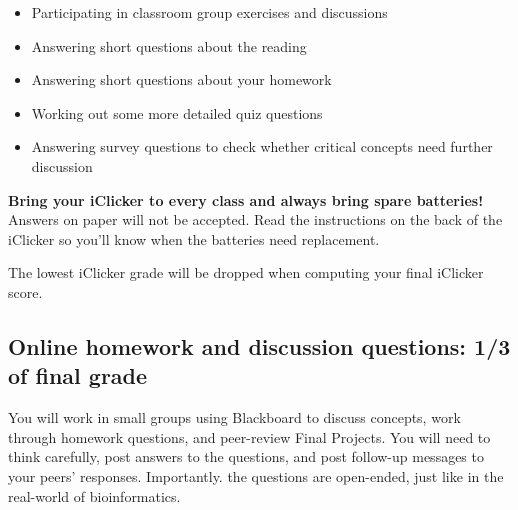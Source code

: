 \documentclass[12pt]{article}
\begin{document}
\begin{itemize}
\item Participating in classroom group exercises and discussions
\item Answering short questions about the reading
\item Answering short questions about your homework
\item Working out some more detailed quiz questions
\item Answering survey questions to check whether critical concepts need
  further discussion

\end{itemize}

{\textbf{Bring your iClicker to every class and always bring spare batteries!}}
Answers on paper will not be accepted. Read the instructions on the back of the
iClicker so you'll know when the batteries need replacement.


The lowest iClicker grade will be dropped when computing your final iClicker score.

\subsection{Online homework and discussion questions: 1/3 of final grade}
\label{sec:online-homew-disc}

You will work in small groups using Blackboard to discuss concepts,
work through homework questions, and peer-review Final Projects.  You will
need to think carefully, post answers to the questions, and post follow-up messages
to your peers' responses.  Importantly. the questions are open-ended, just like in
the real-world of bioinformatics.
\end{document}
